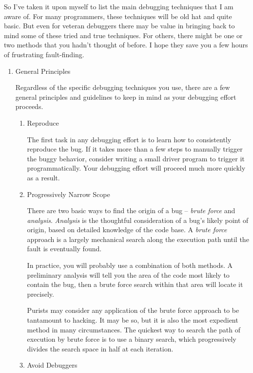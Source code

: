 \documentclass{article}
\begin{document}
So I've taken it upon myself to list the main debugging techniques that
I am aware of. For many programmers, these techniques will be old hat
and quite basic. But even for veteran debuggers there may be value in
bringing back to mind some of these tried and true techniques. For
others, there might be one or two methods that you hadn't thought of
before. I hope they save you a few hours of frustrating fault-finding.

\begin{enumerate}
\item General Principles
\label{sec:orgheadline306}

Regardless of the specific debugging techniques you use, there are a few
general principles and guidelines to keep in mind as your debugging
effort proceeds.

\begin{enumerate}
\item Reproduce
\label{sec:orgheadline302}

The first task in any debugging effort is to learn how to consistently
reproduce the bug. If it takes more than a few steps to manually trigger
the buggy behavior, consider writing a small driver program to trigger
it programmatically. Your debugging effort will proceed much more
quickly as a result.

\item Progressively Narrow Scope
\label{sec:orgheadline303}

There are two basic ways to find the origin of a bug -- \emph{brute force}
and \emph{analysis}. \emph{Analysis} is the thoughtful consideration of a bug's
likely point of origin, based on detailed knowledge of the code base. A
\emph{brute force} approach is a largely mechanical search along the
execution path until the fault is eventually found.

In practice, you will probably use a combination of both methods. A
preliminary analysis will tell you the area of the code most likely to
contain the bug, then a brute force search within that area will locate
it precisely.

Purists may consider any application of the brute force approach to be
tantamount to hacking. It may be so, but it is also the most expedient
method in many circumstances. The quickest way to search the path of
execution by brute force is to use a binary search, which progressively
divides the search space in half at each iteration.

\item Avoid Debuggers
\label{sec:orgheadline304}


\end{enumerate}
\end{enumerate}
\end{document}
